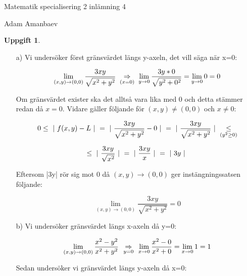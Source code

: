 \documentclass{article}
\newtheorem{thr}{Uppgift}
\begin{document}


\newpage

\centerline{\large Matematik specialisering 2 inlämning 4}

\vskip 0.1cm

\centerline{\scriptsize Adam Amanbaev}

\vskip 0.5cm

\begin{thr}
\end{thr}

\begin{enumerate}
    \item[a)] Vi undersöker först gränsvärdet längs y-axeln, det vill säga när x=0:

        $$
        \mathop\mathrm{lim}_{(x, y)\to(0, 0)}\frac{3xy}{\sqrt{x^2+y^2}}\;
        \underset{(x=0)}{\ \Rightarrow \ }\;
        \mathop\mathrm{lim}_{y\to 0}{\frac{3y*0}{\sqrt{y^2+0^2}}}
        =
        \mathop\mathrm{lim}_{y\to0}{0}
        =
        0
        $$

        \vskip 0.2cm

        Om gränsvärdet exister ska det alltså vara lika med 0 och detta stämmer redan då $x=0$. Vidare gäller följande för $(x, y)\neq(0, 0)$ och $x\neq0$:

        $$
        0\leq \ | \  f(x, y)-L\ | \ 
        =
        \ | \  \frac{3xy}{\sqrt{x^2+y^2}}-0 \ | \ 
        =
        \ | \  \frac{3xy}{\sqrt{x^2+y^2}} \ | \ 
        \underset{(y^2\geq0)}\leq
        $$

        $$
        \leq\ | \ \frac{3xy}{\sqrt{x^2}}\ | \ 
        =
        \ | \ \frac{3xy}{x}\ | \ 
        =
        \ | \ 3y\ | \ 
        $$

        Eftersom |3y| rör sig mot 0 då $(x, y)\to(0, 0)$ ger instängningssatsen följande: 

        $$
        \lim_{(x, y)\to(0, 0)} \frac{3xy}{\sqrt{x^2+y^2}}=0
        $$

        \vskip 0.3cm

    \item[b)] Vi undersöker gränsvärdet längs x-axeln då y=0:
        
        $$
        \mathop\mathrm{lim}_{(x, y)\to(0, 0)}{\frac{x^2-y^2}{x^2+y^2}}\;
        \underset{y=0}{\ \Rightarrow \ }\;
        \mathop\mathrm{lim}_{x\to0}{\frac{x^2-0}{x^2+0}}
        =
        \mathop\mathrm{lim}_{x\to0}{1}
        =
        1
        $$

        \vskip 0.2cm

        Sedan undersöker vi gränsvärdet längs y-axeln då x=0:


\end{enumerate}
\end{document}
